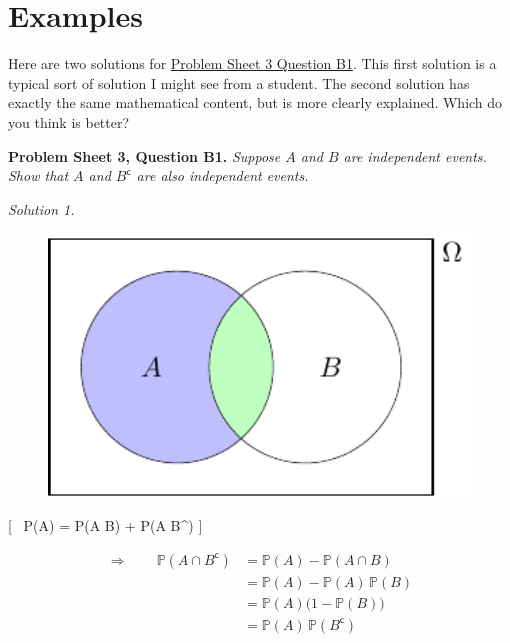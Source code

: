 \documentclass[
  letterpaper,
]{report}
\theoremstyle{definition}
\theoremstyle{definition}
\theoremstyle{remark}
\begin{document}
\hypertarget{writing-ex}{%
\section*{Examples}\label{writing-ex}}


Here are two solutions for \protect\hyperlink{P3-long}{Problem Sheet 3
Question B1}. This first solution is a typical sort of solution I might
see from a student. The second solution has exactly the same
mathematical content, but is more clearly explained. Which do you think
is better?

\textbf{Problem Sheet 3, Question B1.} \emph{Suppose \(A\) and \(B\) are
independent events. Show that \(A\) and \(B^\mathsf{c}\) are also
independent events.}

\emph{Solution 1.}

\begin{figure}

{\centering \includegraphics[width=4.44444in,height=\textheight]{./writing_files/figure-pdf/writing-pic-0-1.pdf}

}

\end{figure}

{[} \therefore ~\qquad \mathbb P(A) = \mathbb P(A \cap B) + \mathbb P(A
\cap B\^{}) {]}

\begin{align*}
\Rightarrow \qquad \mathbb P(A \cap B^\mathsf{c})
&= \mathbb P(A) - \mathbb P(A \cap B) \\
&= \mathbb P(A) - \mathbb P(A)\,\mathbb P(B) \\
&= \mathbb P(A) \big(1 - \mathbb P(B)\big) \\
&= \mathbb P(A) \, \mathbb P(B^\mathsf{c}) 
\end{align*}
\end{document}
